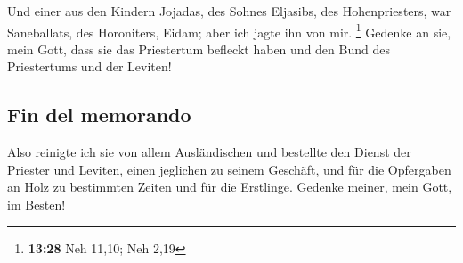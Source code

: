  Und einer aus den Kindern Jojadas, des Sohnes Eljasibs,
des Hohenpriesters, war Saneballats, des Horoniters, Eidam; aber ich
jagte ihn von mir. \footnote{\textbf{13:28} Neh 11,10; Neh 2,19}
 Gedenke an sie, mein Gott, dass sie das Priestertum
befleckt haben und den Bund des Priestertums und der Leviten!

\hypertarget{fin-del-memorando}{%
\subsection{Fin del memorando}\label{fin-del-memorando}}

 Also reinigte ich sie von allem Ausländischen und
bestellte den Dienst der Priester und Leviten, einen jeglichen zu seinem
Geschäft,  und für die Opfergaben an Holz zu bestimmten
Zeiten und für die Erstlinge. Gedenke meiner, mein Gott, im Besten!
